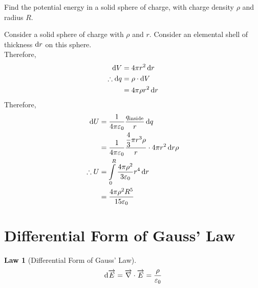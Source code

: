 \documentclass[fleqn, a4paper, 12pt, twoside]{article}
\theoremstyle{definition}
\theoremstyle{theorem}
\newtheorem{law}{Law}
\begin{document}
\begin{question}
	Find the potential energy in a solid sphere of charge, with charge density $\rho$ and radius $R$.
\end{question}

\begin{solution}
	Consider a solid sphere of charge with $\rho$ and $r$.
	Consider an elemental shell of thickness $\dif r$ on this sphere.\\
	Therefore,
	\begin{align*}
		\dif V &= 4 \pi r^2 \dif r\\
		\therefore \dif q &= \rho \cdot \dif V\\
		&= 4 \pi \rho r^2 \dif r
	\end{align*}
	Therefore,
	\begin{align*}
		\dif U &= \dfrac{1}{4 \pi \varepsilon_0} \dfrac{q_{\textnormal{inside}}}{r} \dif q\\
		&= \dfrac{1}{4 \pi \varepsilon_0} \dfrac{\dfrac{4}{3} \pi r^3 \rho}{r} \cdot 4 \pi r^2 \dif r \rho\\
		\therefore U &= \int\limits_{0}^{R} \dfrac{4 \pi \rho^2}{3 \varepsilon_0} r^4 \dif r\\
		&= \dfrac{4 \pi \rho^2 R^5}{15 \varepsilon_0}
	\end{align*}
\end{solution}

\section{Differential Form of Gauss' Law}

\begin{law}[Differential Form of Gauss' Law]
	\begin{equation*}
		\dif \overrightarrow{E} = \overrightarrow{\nabla} \cdot \overrightarrow{E} = \frac{\rho}{\varepsilon_0}
	\end{equation*}
	\label{Differential_Form_of_Gauss'_Law}
\end{law}
\end{document}
